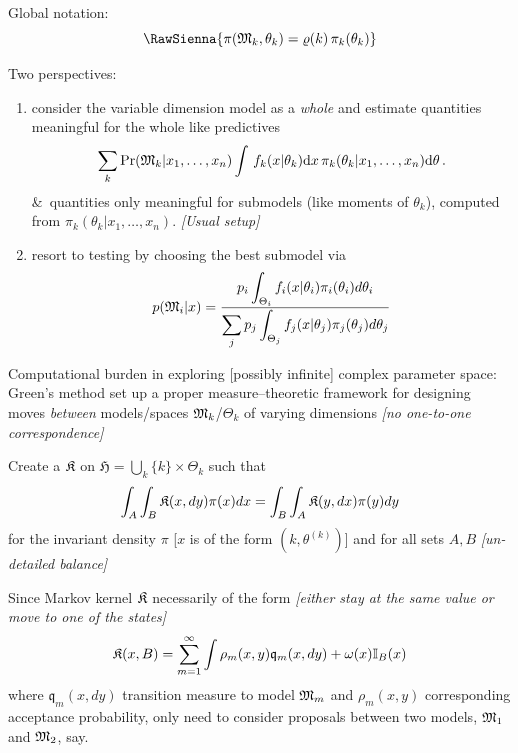 \begin{slide}
Global notation:
$$\RawSienna{
  \pi(\GoM_k,\theta_k) = \varrho(k)\,\pi_k(\theta_k)
}$$

\end{slide}\begin{slide}

Two perspectives:
\begin{enumerate}
\item consider the variable dimension model as a {\em whole} and estimate quantities meaningful 
for the whole like predictives
\small$$
\sum_k \hbox{Pr}({\mathfrak M}_k|x_1,\ldots,x_n)
\int \,f_k(x|\theta_k) \hbox{d}x\,\pi_k(\theta_k|x_1,\ldots,x_n) \hbox{d}\theta\,.
$$\pause\normalsize
\&\ quantities only meaningful for submodels (like moments of $\theta_k$), computed
from $\pi_k(\theta_k|x_1,\ldots,x_n)$. {\em [Usual setup]}

\item resort to testing by choosing the best submodel via
\footnotesize$$
p(\mathfrak{M}_i|x) = { \displaystyle{p_i \int_{\Theta_i} f_i(x|\theta_i) 
         \pi_i(\theta_i) d\theta_i} \over
\displaystyle{\sum_j p_j \int_{\Theta_j} f_j(x|\theta_j) \pi_j(\theta_j) 
      d\theta_j}  }  
$$\normalsize
\end{enumerate}

\end{slide}\begin{slide}

Computational burden in exploring [possibly infinite] complex parameter space:
Green's method set up a proper measure--theoretic framework for
designing moves {\em between} models/spaces $\mathfrak{M}_k$/$\Theta_k$
of varying dimensions {\em [no one-to-one correspondence]}

\vs\pause
Create a 
$\mathfrak{K}$ on $\mathfrak{H}=\bigcup_k \{k\}\times\Theta_k$ such that 
$$
\int_A \int_B \mathfrak{K}(x,dy) \pi(x) dx = \int_B \int_A \mathfrak{K}(y,dx) \pi(y) dy
$$
for the invariant density $\pi$ [$x$ is of the form $(k,\theta^{(k)})$] 
and for all sets $A,B$ {\em [un-detailed balance]}

\end{slide}\begin{slide}

Since Markov kernel $\mathfrak{K}$ necessarily of the form 
{\em [either stay at the same value or move to one of the states]}
$$
\mathfrak{K}(x,B) = \sum_{m=1}^\infty \int \rho_m(x,y) \mathfrak{q}_m(x,dy) + \omega(x)\mathbb{I}_B(x)
$$
where $\mathfrak{q}_m(x,dy)$ transition measure to model $\mathfrak{M}_m$ and $\rho_m(x,y)$
corresponding acceptance probability, \pause only need to consider proposals between two models,
$\mathfrak{M}_1$ and $\mathfrak{M}_2$, say.


\end{slide}
